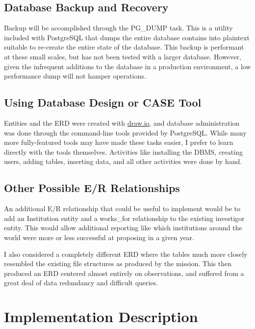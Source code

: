 \documentclass[a4paper,11pt]{article}
\begin{document}
\subsection{Database Backup and Recovery}
Backup will be accomplished through the PG\_DUMP task.  This is a utility included with PostgreSQL that dumps the entire database contains into plaintext suitable to re-create the entire state of the database.  This backup is performant at these small scales, but has not been tested with a larger database.  However, given the infrequent additions to the database in a production environment, a low performance dump will not hamper operations.  

\subsection{Using Database Design or CASE Tool}
Entities and the ERD were created with \href{https://draw.io}{draw.io}, and database administration was done through the command-line tools provided by PostgreSQL.  While many more fully-featured tools may have made these tasks easier, I prefer to learn directly with the tools themselves.  Activities like installing the DBMS, creating users, adding tables, inserting data, and all other activities were done by hand. 

\subsection{Other Possible E/R Relationships}
An additional E/R relationship that could be useful to implement would be to add an Institution entity and a works\_for relationship to the existing investigor entity.  This would allow additional reporting like which institutions around the world were more or less successful at proposing in a given year. 

I also considered a completely different ERD where the tables much more closely resembled the existing file structures as produced by the mission.  This then produced an ERD centered almost entirely on observations, and suffered from a great deal of data redundancy and difficult queries. 

\section{Implementation Description}
\end{document}
